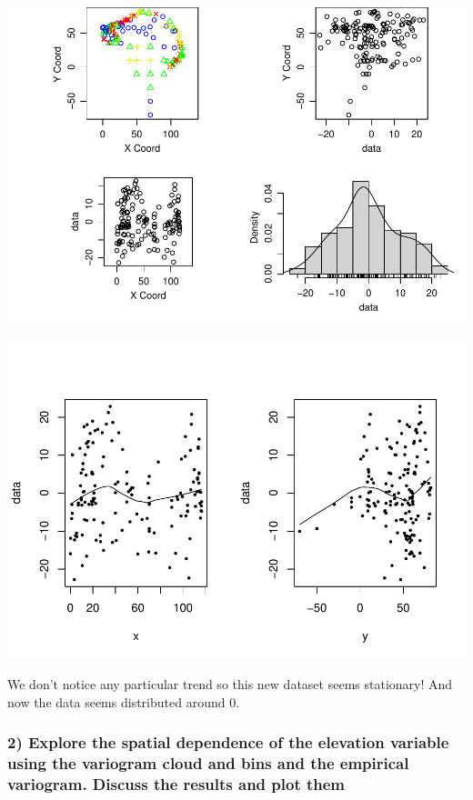 \documentclass[
]{article}
\begin{document}
\includegraphics{Assignment_1_files/figure-latex/unnamed-chunk-10-1.pdf}

\includegraphics{Assignment_1_files/figure-latex/unnamed-chunk-11-1.pdf}

We don't notice any particular trend so this new dataset seems
stationary! And now the data seems distributed around 0.

\hypertarget{explore-the-spatial-dependence-of-the-elevation-variable-using-the-variogram-cloud-and-bins-and-the-empirical-variogram.-discuss-the-results-and-plot-them}{%
\subsubsection{2) Explore the spatial dependence of the elevation
variable using the variogram cloud and bins and the empirical variogram.
Discuss the results and plot
them}\label{explore-the-spatial-dependence-of-the-elevation-variable-using-the-variogram-cloud-and-bins-and-the-empirical-variogram.-discuss-the-results-and-plot-them}}
\end{document}
